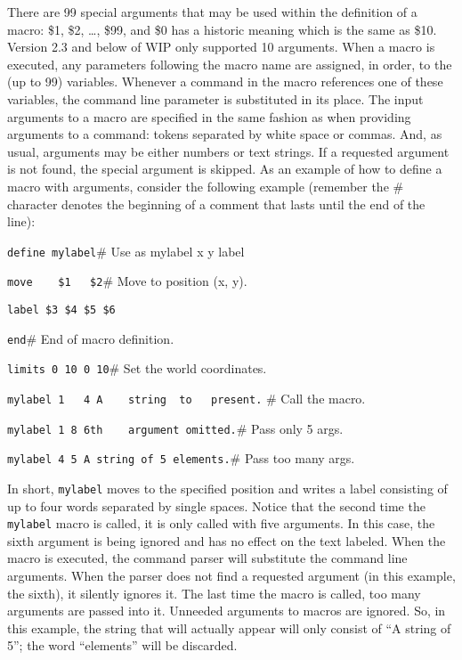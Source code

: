 There are 99 special arguments that may be used within the definition of
a macro: \$1, \$2, \ldots, \$99, and \$0 has a historic meaning
which is the same as \$10. Version 2.3 and below of WIP only
supported 10 arguments.
When a macro is executed, any parameters following the macro name are
assigned, in order, to the (up to 99) variables. 
Whenever a command in the macro references one of these variables,
the command line parameter is substituted in its place.
The input arguments to a macro are specified in the same fashion as when
providing arguments to a command:
tokens separated by white space or commas.
And, as usual, arguments may be either numbers or text strings.
If a requested argument is not found, the special argument is skipped.
As an example of how to define a macro with arguments, consider
the following example (remember the \# character denotes the beginning
of a comment that lasts until the end of the line):
\begin{wiplist}%
  \item [\wipp] {\tt define mylabel}\hfill\# Use as mylabel x y label
\samepage
  \item [\wipd] {\tt move~~~~\$1~~~\$2}\hfill\# Move to position (x, y).
  \item [\wipd] {\tt label \$3 \$4 \$5 \$6}
  \item [\wipd] {\tt end}\hfill\# End of macro definition.
  \item [\wipp] {\tt limits 0 10 0 10}\hfill\# Set the world coordinates.
  \item [\wipp] {\tt mylabel 1~~~4 A~~~ string\ \ to~~~present.}\hfill
    \# Call the macro.
  \item [\wipp] {\tt mylabel 1 8 6th~~~~argument omitted.}\hfill\# Pass
    only 5 args.
  \item [\wipp] {\tt mylabel 4 5 A string of 5 elements.}\hfill\# Pass
    too many args.
\end{wiplist}
In short, {\tt mylabel} moves to the specified position and writes a label
consisting of up to four words separated by single spaces.
Notice that the second time the {\tt mylabel} macro is called,
it is only called with five arguments.
In this case, the sixth argument is being ignored and has no effect
on the text labeled.
When the macro is executed, the command parser will substitute the
command line arguments.
When the parser does not find a requested argument (in this example, the
sixth), it silently ignores it.
The last time the macro is called, too many arguments are passed into it.
Unneeded arguments to macros are ignored.
So, in this example, the string that will actually appear will only
consist of ``A string of 5''; the word ``elements'' will be discarded.

